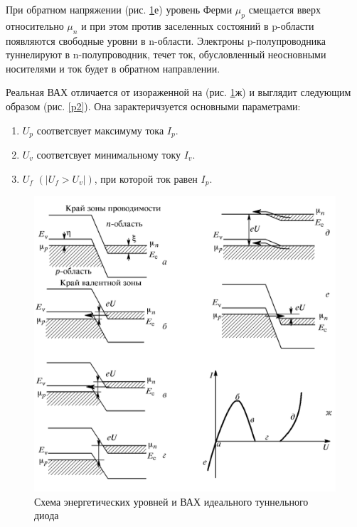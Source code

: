 \documentclass[a4paper]{article}
\begin{document}
При обратном напряжении (рис. \ref{cheme}е) уровень Ферми $\mu_p$ смещается вверх относительно $\mu_n$ и при этом против заселенных состояний в p-области появляются свободные уровни в n-области. Электроны p-полупроводника туннелируют в n-полупроводник, течет ток, обусловленный 
неосновными носителями и ток будет в обратном направлении.  \par 

Реальная ВАХ отличается от изораженной на (рис. \ref{cheme}ж) и выглядит следующим образом (рис. \ref{p2}). Она зарактеричзуется основными параметрами:

\begin{enumerate}
    \item $U_p$ соответсвует максимуму тока $I_p$.
    \item $U_v$ соответсвует минимальному току $I_v$.
    \item $U_f$ $(|U_f > U_v|)$, при которой ток равен $I_p$.
\end{enumerate}



\begin{figure}[h]
    \begin{center}
        \includegraphics[scale = 0.8]{cheme.png}
        \caption{Схема энергетических уровней и ВАХ идеального туннельного диода}
        \label{cheme}
    \end{center}
\end{figure}
\end{document}
